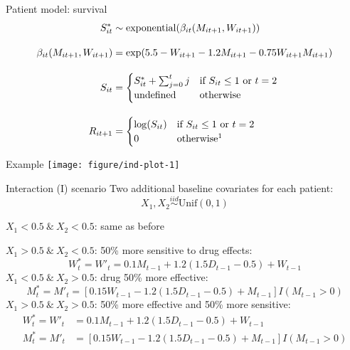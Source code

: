 \documentclass[handout]{beamer}
\begin{document}
\begin{frame}[c]{Patient model: survival}
  \begin{align*}
    S^{*}_{it} &\sim \operatorname{exponential}(\beta_{it}(M_{it + 1}, W_{it + 1})) \\[1em]
    \beta_{it}(M_{it+1}, W_{it+1}) &= \exp(5.5 - W_{it+1} - 1.2 M_{it+1} - 0.75 W_{it+1} M_{it+1}) \\[1em]
    S_{it} &= \begin{cases}
      S^{*}_{it} + \sum_{j = 0}^{t} j & \text{if } S_{it} \leq 1 \text{ or } t = 2 \\
      \text{undefined} & \text{otherwise}
    \end{cases} \\[1em]
    R_{it + 1} &=\begin{cases}
          \log(S_{it}) & \text{if } S_{it} \leq 1 \text{ or } t = 2 \\
          0 & \text{otherwise\footnotemark}
        \end{cases}
  \end{align*}  
\end{frame}

\begin{frame}[c]{Example}
  \texttt{[image: figure/ind-plot-1]} 
\end{frame}

\begin{frame}[c]{Interaction (I) scenario}
  Two additional baseline covariates for each patient:
  \begin{equation*}
    X_{1}, X_{2} \overset{iid}{\sim} \text{Unif}(0, 1)
  \end{equation*}
  
  $X_{1} < 0.5 \ \& \ X_{2} < 0.5$: same as before
  
  
  $X_{1} > 0.5 \ \& \ X_{2} < 0.5$: 50\% more sensitive to drug effects:
  \begin{equation*}
  W^{*}_{t} = W'_{t} = 0.1 M_{t-1} + 1.2 (1.5 D_{t-1} - 0.5) + W_{t - 1}
  \end{equation*}
  $X_{1} < 0.5 \ \& \ X_{2} > 0.5$: drug 50\% more effective:
  \begin{equation*}
  M^{*}_{t} =  M'_{t} = [0.15 W_{t-1} - 1.2 (1.5 D_{t-1} - 0.5) + M_{t - 1}] I(M_{t-1} > 0)
  \end{equation*}
  $X_{1} > 0.5 \ \& \ X_{2} > 0.5$: 50\% more effective and 50\% more sensitive:
  \begin{align*}
  W^{*}_{t} = W'_{t} &= 0.1 M_{t-1} + 1.2 (1.5 D_{t-1} - 0.5) + W_{t - 1} \\
  M^{*}_{t} = M'_{t} &= [0.15 W_{t-1} - 1.2 (1.5 D_{t-1} - 0.5) + M_{t - 1}] I(M_{t-1} > 0)
  \end{align*}
\end{frame}
\end{document}
